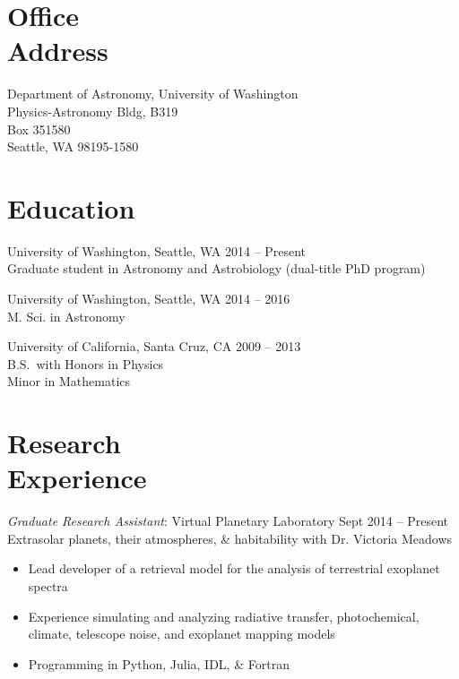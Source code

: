 \documentclass[margin,10pt]{res}
\begin{document}
\begin{resume}

\section{Office \\Address}
Department of Astronomy, University of Washington \\
Physics-Astronomy Bldg, B319 \\
Box 351580 \\
Seattle, WA 98195-1580 \\

\section{Education} 
University of Washington, Seattle, WA \hfill 2014 -- Present\\
Graduate student in Astronomy and Astrobiology (dual-title PhD program)  

University of Washington, Seattle, WA \hfill 2014 -- 2016\\
M. Sci. in Astronomy

University of California, Santa Cruz, CA  \hfill 2009 -- 2013\\
B.S.\ with Honors in Physics \\
Minor in Mathematics\\

\section{Research \\Experience} 
                {\sl Graduate Research Assistant}: Virtual Planetary Laboratory   \hfill          Sept 2014 -- Present\\
                Extrasolar planets, their atmospheres, \& habitability with Dr. Victoria Meadows
                    \begin{itemize}  \itemsep -1pt %
                        \item Lead developer of a retrieval model for the analysis of terrestrial exoplanet spectra 
                        \item Experience simulating and analyzing radiative transfer, photochemical, climate, telescope noise, and exoplanet mapping models
                        \item Programming in Python, Julia, IDL, \& Fortran
                    \end{itemize}  


\end{resume}
\end{document}

